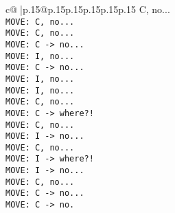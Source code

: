 \documentclass{article}
\begin{document}
{\begin{supertabular}{c@{$\;$}|p{.15\linewidth}@{}p{.15\linewidth}p{.15\linewidth}p{.15\linewidth}p{.15\linewidth}p{.15\linewidth}}
{{{ C, no...\\ \tt  MOVE: C, no...\\ \tt  MOVE: C, no...\\ \tt  MOVE: C -> no...\\ \tt  MOVE: I, no...\\ \tt  MOVE: C -> no...\\ \tt  MOVE: I, no...\\ \tt  MOVE: I, no...\\ \tt  MOVE: C, no...\\ \tt  MOVE: C -> where?!\\ \tt  MOVE: C, no...\\ \tt  MOVE: I -> no...\\ \tt  MOVE: C, no...\\ \tt  MOVE: I -> where?!\\ \tt  MOVE: I -> no...\\ \tt  MOVE: C, no...\\ \tt  MOVE: C -> no...\\ \tt  MOVE: C -> no.}}}
\end{supertabular}}
\end{document}
